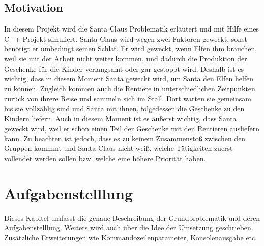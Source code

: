 \documentclass[a4paper,12pt]{article}
\begin{document}
\subsection{Motivation}
In diesem Projekt wird die Santa Claus Problematik erläutert und mit Hilfe eines C++ Projekt simuliert. Santa Claus wird wegen 
zwei Faktoren geweckt, sonst benötigt er umbedingt seinen Schlaf. Er wird geweckt, wenn Elfen ihm brauchen, weil sie mit der Arbeit
nicht weiter kommen, und dadurch die Produktion der Geschenke für die Kinder verlangsamt oder gar gestoppt wird. Deshalb ist es wichtig, dass 
in diesem Moment Santa geweckt wird, um Santa den Elfen helfen zu können. Zugleich kommen auch die Rentiere in unterschiedlichen Zeitpunkten zurück von ihrere Reise und sammeln sich im Stall.
Dort warten sie gemeinsam bis sie vollzählig sind und Santa mit ihnen, folgedessen die Geschenke zu den Kindern liefern. Auch in diesem Moment ist es
äußerst wichtig, dass Santa geweckt wird, weil er schon einen Teil der Geschenke mit den Rentieren ausliefern kann. Zu beachten ist jedoch, dass es zu keinem Zusammenstoß zwischen den Gruppen kommmt
und Santa Claus nicht weiß, welche Tätigkeiten zuerst vollendet werden sollen bzw. welche eine höhere Priorität haben.

\section{Aufgabenstelllung}
Dieses Kapitel umfasst die genaue Beschreibung der Grundproblematik und deren Aufgabenstelllung. Weiters wird auch über die Idee der Umsetzung geschrieben. Zusätzliche Erweiterungen wie
Kommandozeilenparameter, Konsolenausgabe etc.
\end{document}
